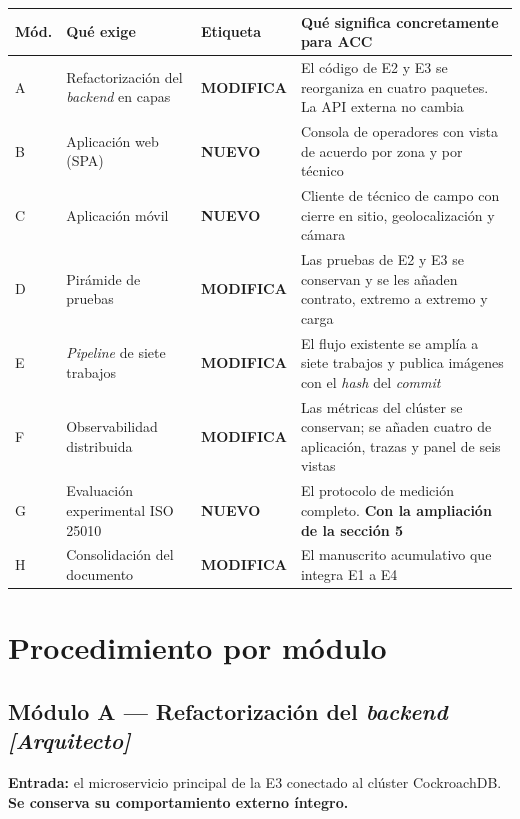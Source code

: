 \documentclass[11pt,a4paper]{article}
\newcommand{\cambia}{\cellcolor{filaCambia}\textbf{MODIFICA}}
\newcommand{\nuevo}{\cellcolor{filaNuevo}\textbf{NUEVO}}
\begin{document}
\begin{center}
	\footnotesize
	\begin{longtable}{@{}p{1.0cm}p{3.5cm}p{1.6cm}p{9.0cm}@{}}
		\toprule
		\textbf{Mód.} & \textbf{Qué exige} & \textbf{Etiqueta} & \textbf{Qué significa concretamente para ACC} \\
		\midrule
		\endhead
		A & Refactorización del \emph{backend} en capas & \cambia & El código de E2 y E3 se reorganiza en cuatro paquetes. La API externa no cambia \\
		\addlinespace
		B & Aplicación web (SPA) & \nuevo & Consola de operadores con vista de acuerdo por zona y por técnico \\
		\addlinespace
		C & Aplicación móvil & \nuevo & Cliente de técnico de campo con cierre en sitio, geolocalización y cámara \\
		\addlinespace
		D & Pirámide de pruebas & \cambia & Las pruebas de E2 y E3 se conservan y se les añaden contrato, extremo a extremo y carga \\
		\addlinespace
		E & \emph{Pipeline} de siete trabajos & \cambia & El flujo existente se amplía a siete trabajos y publica imágenes con el \emph{hash} del \emph{commit} \\
		\addlinespace
		F & Observabilidad distribuida & \cambia & Las métricas del clúster se conservan; se añaden cuatro de aplicación, trazas y panel de seis vistas \\
		\addlinespace
		G & Evaluación experimental ISO 25010 & \nuevo & El protocolo de medición completo. \textbf{Con la ampliación de la sección 5} \\
		\addlinespace
		H & Consolidación del documento & \cambia & El manuscrito acumulativo que integra E1 a E4 \\
		\bottomrule
	\end{longtable}
\end{center}

\section{Procedimiento por módulo}

\subsection{Módulo A --- Refactorización del \emph{backend} \emph{[Arquitecto]}}

\textbf{Entrada:} el microservicio principal de la E3 conectado al clúster CockroachDB. \textbf{Se conserva su comportamiento externo íntegro.}
\end{document}
